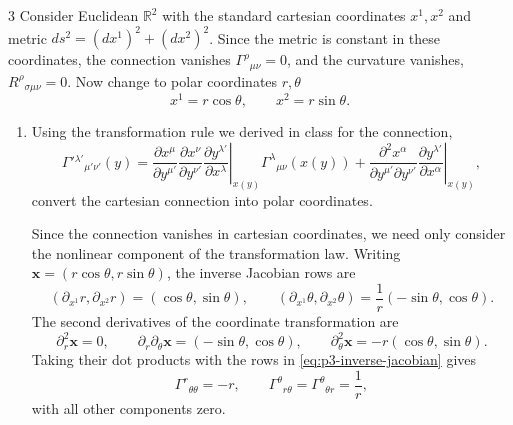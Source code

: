 \documentclass[11pt]{article}
\begin{document}
\begin{problem}{3}
	Consider Euclidean \(\mathbb{R}^2\) with the standard cartesian coordinates \(x^1,x^2\) and metric \(ds^2=(dx^1)^2+(dx^2)^2\).
	Since the metric is constant in these coordinates, the connection vanishes \(\Gamma^\rho{}_{\mu\nu}=0\), and the curvature vanishes, \(R^\rho{}_{\sigma\mu\nu}=0\).
	Now change to polar coordinates \(r,\theta\)
	\begin{equation}
		\label{eq:p3-polar-coordinates}
		x^1=r\cos\theta,\qquad x^2=r\sin\theta.
	\end{equation}
	\begin{enumerate}[label=(\alph*)]
		\item Using the transformation rule we derived in class for the connection,
		      \begin{equation}
			      \label{eq:p3-connection-transformation}
			      \Gamma'{}^{\lambda'}{}_{\mu'\nu'}(y)
			      =\frac{\partial x^\mu}{\partial y^{\mu'}}
			      \frac{\partial x^\nu}{\partial y^{\nu'}}
			      \left.\frac{\partial y^{\lambda'}}{\partial x^\lambda}\right|_{x(y)}
			      \Gamma^\lambda{}_{\mu\nu}(x(y))
			      +\frac{\partial^2 x^\alpha}{\partial y^{\mu'}\partial y^{\nu'}}
			      \left.\frac{\partial y^{\lambda'}}{\partial x^\alpha}\right|_{x(y)},
		      \end{equation}
		      convert the cartesian connection into polar coordinates.
          \begin{answer}
            Since the connection vanishes in cartesian coordinates, we need only consider the nonlinear component of the transformation law.
            Writing \(\mathbf{x}=(r\cos\theta,r\sin\theta)\), the inverse Jacobian rows are
            \begin{equation}
              \left(\partial_{x^1}r,\partial_{x^2}r\right)=(\cos\theta,\sin\theta),\qquad
              \left(\partial_{x^1}\theta,\partial_{x^2}\theta\right)=\frac1r(-\sin\theta,\cos\theta).
              \label{eq:p3-inverse-jacobian}
            \end{equation}
            The second derivatives of the coordinate transformation are
            \begin{equation}
              \partial_r^2\mathbf{x}=0,\qquad
              \partial_r\partial_\theta\mathbf{x}=(-\sin\theta,\cos\theta),\qquad
              \partial_\theta^2\mathbf{x}=-r(\cos\theta,\sin\theta).
              \label{eq:p3-second-derivatives}
            \end{equation}
            Taking their dot products with the rows in \cref{eq:p3-inverse-jacobian} gives
            \begin{equation}
              \Gamma^r{}_{\theta\theta}=-r,\qquad
              \Gamma^\theta{}_{r\theta}=\Gamma^\theta{}_{\theta r}=\frac1r,
              \label{eq:p3-transformed-connection}
            \end{equation}
            with all other components zero.


\end{answer}
\end{enumerate}
\end{problem}
\end{document}
